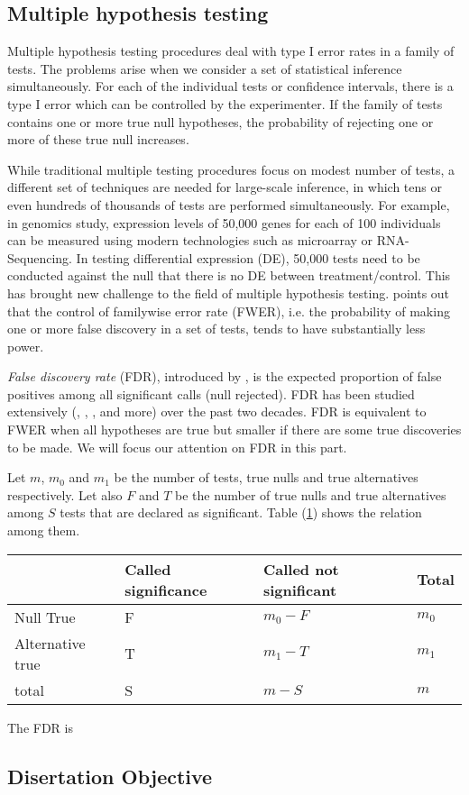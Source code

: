 	
	\subsection{Multiple hypothesis testing}
	Multiple hypothesis testing procedures deal with type I error rates in a family of tests. The problems arise when we consider a set of statistical inference simultaneously.  For each of the individual tests or confidence intervals, there is a type I error which can be controlled by the experimenter.  If the family of tests contains one or more true null hypotheses, the probability of rejecting one or more of these true null increases. 
	
	While traditional multiple testing procedures focus on modest number of tests, a different set of techniques are needed for large-scale inference, in which tens or even hundreds of thousands of tests are performed simultaneously. For example, in genomics study, expression levels of 50,000 genes for each of 100 individuals can be measured using modern technologies such as microarray or RNA-Sequencing. In testing differential expression (DE), 50,000 tests need to be conducted against the null that there is no DE between treatment/control. This has brought new challenge to the field of multiple hypothesis testing. \cite{benjamini1995controlling} points out that the control of familywise error rate (FWER), i.e. the probability of making one or more false discovery in a set of tests, tends to have substantially less power. 
	
	\textit{False discovery rate} (FDR), introduced by \cite{benjamini1995controlling}, is the expected proportion of false positives among all significant calls (null rejected). FDR has been studied extensively (\cite{benjamini2001control}, \cite{storey2003statistical}, \cite{efron2004large}, \cite{efron2010large} and more) over the past two decades.  FDR is equivalent to FWER \citep{benjamini1995controlling} when all hypotheses are true but smaller if there are some true discoveries to be made. We will focus our attention on FDR in this part. 
	
	Let $m$,  $m_0$  and $m_1$ be the number of tests,  true nulls  and true alternatives respectively. Let also $F$ and $T$ be the number of true nulls and true alternatives among $S$ tests that are declared as significant. Table (\ref{table1}) shows the  relation among them. 
	\begin{table}[h]\label{table1}\begin{center}
			\begin{tabular}{llll}
				& Called significance & Called not significant & Total  \\ \hline
				Null True &F &$m_0-F$  & $m_0$  \\
				Alternative true & T  & $m_1 -T$  & $m_1$  \\
				total & S & $m-S$  & $m$ \\ \hline
			\end{tabular}\end{center}
		\end{table} 
		The FDR is 
			
\subsection{Disertation Objective}
	
